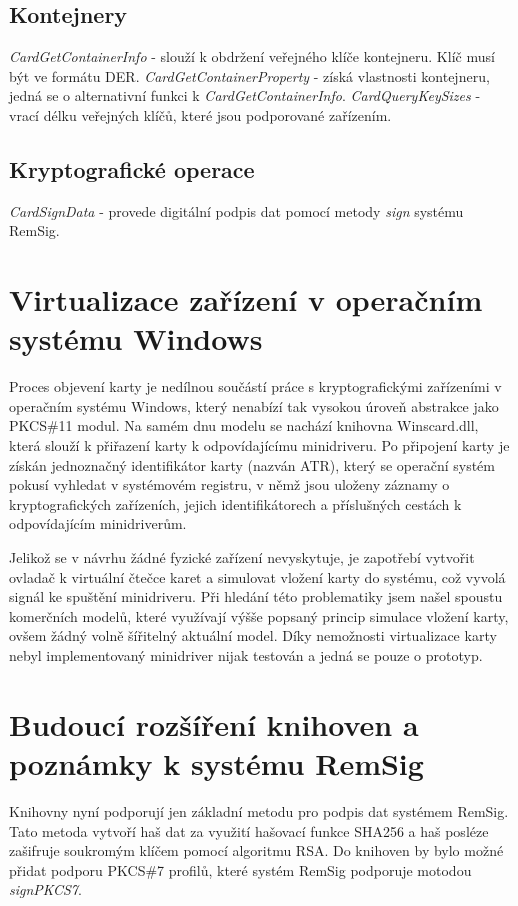 \documentclass[]{fithesis3}
\begin{document}
		\subsection{Kontejnery}
		\textit{CardGetContainerInfo} - slouží k obdržení veřejného klíče kontejneru. Klíč musí být 			ve formátu DER.
		\newline
 		\newline
		\textit{CardGetContainerProperty} - získá vlastnosti kontejneru, jedná se o alternativní 			funkci k \textit{CardGetContainerInfo}.
		\newline
		\newline
		\textit{CardQueryKeySizes} - vrací délku veřejných klíčů, které jsou podporované 				zařízením.

		\subsection{Kryptografické operace}
		\textit{CardSignData} - provede digitální podpis dat pomocí metody  \textit{sign} systému 			RemSig. 

	\section{Virtualizace zařízení v operačním systému Windows}
	
	Proces objevení karty je nedílnou součástí práce s kryptografickými zařízeními v operačním 			systému Windows, který nenabízí tak vysokou úroveň abstrakce jako PKCS\#11 modul. Na 		samém dnu modelu se nachází knihovna Winscard.dll, která slouží k přiřazení karty k 				odpovídajícímu minidriveru. Po připojení karty je získán jednoznačný identifikátor karty (nazván 		ATR), který se operační systém pokusí vyhledat v systémovém registru, v němž jsou uloženy 		záznamy o kryptografických zařízeních, jejich identifikátorech a příslušných cestách k 				odpovídajícím minidriverům.

	Jelikož se v návrhu žádné fyzické zařízení nevyskytuje, je zapotřebí vytvořit ovladač k virtuální 		čtečce karet a simulovat vložení karty do systému, což vyvolá signál ke spuštění minidriveru. Při 	hledání této problematiky jsem našel spoustu komerčních modelů, které využívají výšše 			popsaný princip simulace vložení karty, ovšem žádný volně šířitelný aktuální model. Díky 			nemožnosti virtualizace karty nebyl implementovaný minidriver nijak testován a jedná se pouze 		o prototyp.

	\section{Budoucí rozšíření knihoven a poznámky k systému RemSig}
	Knihovny nyní podporují jen základní metodu pro podpis dat systémem RemSig. Tato metoda 		vytvoří haš dat za využití hašovací funkce SHA256 a haš posléze zašifruje soukromým klíčem 		pomocí algoritmu RSA. Do knihoven by bylo možné přidat podporu PKCS\#7 profilů, které 			systém RemSig podporuje motodou \textit{signPKCS7}.  \newline
\end{document}
